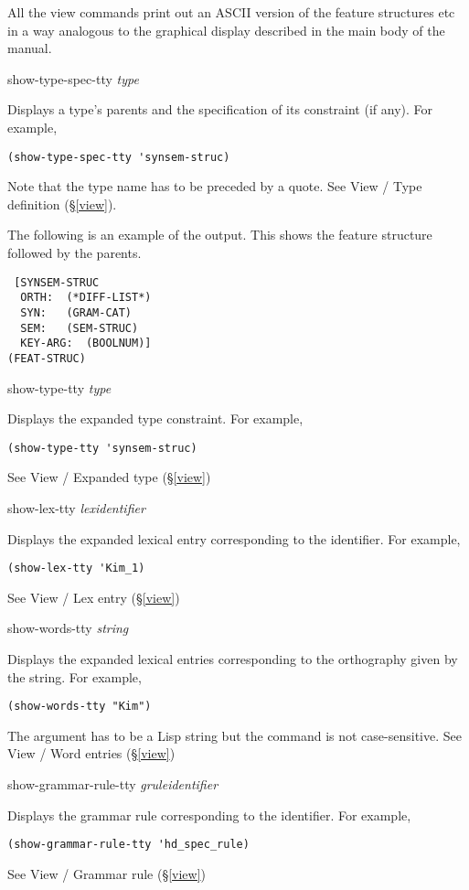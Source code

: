 \documentclass[12pt]{report}
\newcommand{\lispcommand}[1]{\noindent\rm #1}%
\newcommand{\lkbmenucommand}{{\bf}}
\begin{document}
All the view commands print out an ASCII version of the 
feature structures etc in a way analogous to the
graphical display described in the main body of the manual.

\lispcommand{show-type-spec-tty {\it type}}

Displays a type's parents 
and the specification of its constraint (if any).
For example,
\begin{verbatim}
(show-type-spec-tty 'synsem-struc)
\end{verbatim}
Note that the type name has to be preceded by a quote.
See {\lkbmenucommand View} / {\lkbmenucommand Type definition} (\S\ref{view}).

The following is an example of the output.
This shows the feature structure followed by the
parents.
\begin{verbatim}
 [SYNSEM-STRUC
  ORTH:  (*DIFF-LIST*)
  SYN:   (GRAM-CAT)
  SEM:   (SEM-STRUC)
  KEY-ARG:  (BOOLNUM)]
(FEAT-STRUC)
\end{verbatim}

\lispcommand{show-type-tty {\it type}}

Displays the expanded type constraint.
For example,
\begin{verbatim}
(show-type-tty 'synsem-struc)
\end{verbatim}
See {\lkbmenucommand View} / {\lkbmenucommand Expanded type} (\S\ref{view})

\lispcommand{show-lex-tty {\it lexidentifier}}

Displays the expanded lexical entry corresponding to the identifier.
For example,
\begin{verbatim}
(show-lex-tty 'Kim_1)
\end{verbatim}
See {\lkbmenucommand View} / {\lkbmenucommand Lex entry} (\S\ref{view})

\lispcommand{show-words-tty {\it string}}

Displays the expanded lexical entries corresponding to the 
orthography given by the string.
For example,
\begin{verbatim}
(show-words-tty "Kim")
\end{verbatim}
The argument has to be a Lisp string but the command is
not case-sensitive.
See {\lkbmenucommand View} / {\lkbmenucommand Word entries} (\S\ref{view})

\lispcommand{show-grammar-rule-tty {\it gruleidentifier}}

Displays the grammar rule corresponding to the identifier.
For example,
\begin{verbatim}
(show-grammar-rule-tty 'hd_spec_rule)
\end{verbatim}
See {\lkbmenucommand View} / {\lkbmenucommand Grammar rule} (\S\ref{view})
\end{document}
